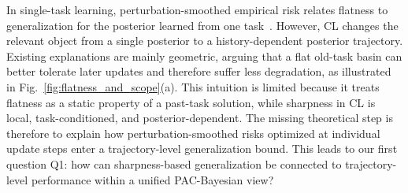 \documentclass{article}
\begin{document}
In single-task learning, perturbation-smoothed empirical risk relates flatness to generalization for the posterior learned from one task~\cite{foretSharpnessAwareMinimizationEfficiently2021,mollenhoffSAMOptimalRelaxation2022}.
However, CL changes the relevant object from a single posterior to a history-dependent posterior trajectory.
Existing explanations are mainly geometric, arguing that a flat old-task basin can better tolerate later updates and therefore suffer less degradation, as illustrated in Fig.~\ref{fig:flatness_and_scope}(a).
This intuition is limited because it treats flatness as a static property of a past-task solution, while sharpness in CL is local, task-conditioned, and posterior-dependent.
The missing theoretical step is therefore to explain how perturbation-smoothed risks optimized at individual update steps enter a trajectory-level generalization bound.
This leads to our first question Q1:  how can sharpness-based generalization be connected to trajectory-level performance within a unified PAC-Bayesian view?
\end{document}
